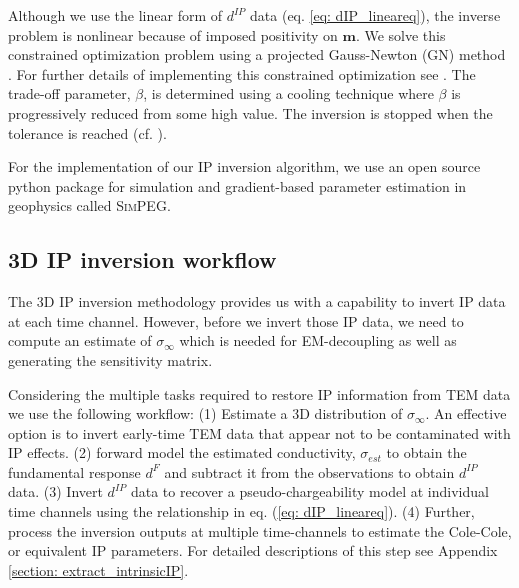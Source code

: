 \documentclass[extra,mreferee]{gji}
\newcommand{\SimPEG}{\textsc{SimPEG}\xspace}
\newcommand{\siginf}{\sigma_\infty}
\newcommand{\dip}{d^{IP}}
\begin{document}
Although we use the linear form of $\dip$ data (eq. \ref{eq: dIP_lineareq}), the inverse problem is nonlinear because of imposed positivity on $\mathbf{m}$.
We solve this constrained optimization problem using a projected Gauss-Newton (GN) method \cite[]{Kelley}. For further details of implementing this constrained optimization see \cite{Marchant2012b}.
The trade-off parameter, $\beta$, is determined using a cooling technique where $\beta$ is progressively reduced from some high value. The inversion is stopped when the tolerance is reached (cf. \cite{Nocedal1999,DougTutorial}).

For the implementation of our IP inversion algorithm, we use an open source python package for simulation and gradient-based parameter estimation in geophysics called \SimPEG \cite[]{Cockett2015}.


\subsection{3D IP inversion workflow}
The 3D IP inversion methodology provides us with a capability to invert IP data at each time channel. However, before we invert those IP data, we need to compute an estimate of $\siginf$ which is needed for EM-decoupling as well as generating the sensitivity matrix.



Considering the multiple tasks required to restore IP information from TEM data we use the following workflow: (1) Estimate a 3D distribution of $\siginf$. An effective option is to invert early-time TEM data that appear not to be contaminated with IP effects. (2) forward model the estimated conductivity, $\sigma_{est}$ to obtain the fundamental response $d^F$ and subtract it from the observations to obtain $\dip$ data.
(3) Invert  $\dip$ data to recover a pseudo-chargeability model at individual time channels using the relationship in eq. (\ref{eq: dIP_lineareq}).
(4) Further, process the inversion outputs at multiple time-channels  to estimate the Cole-Cole, or equivalent IP parameters. For detailed descriptions of this step see Appendix \ref{section: extract_intrinsicIP}.
\end{document}

